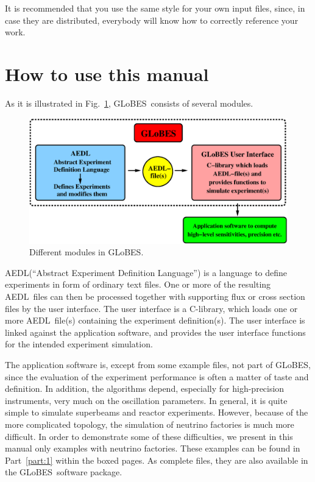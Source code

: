 \documentclass[a4paper,12pt,twoside]{book}
\newcommand{\fig}{Fig.}
\newcommand{\Part}{Part}
\newcommand{\GLOBES}{{\sf GLoBES}}
\newcommand{\AEDL}{{\sf AEDL}}
\newcommand{\figu}[1]{\fig~\ref{fig:#1}}
\begin{document}
It is recommended that you use the same style for your own input files, since, in case they are distributed, everybody will know how to correctly reference your work.

\cleardoublepage
\tableofcontents

\cleardoublepage
\setcounter{page}{1}

\chapter*{How to use this manual}

As it is illustrated in \figu{GLOBES}, \GLOBES\ consists 
of several modules.
%
\begin{figure}[bht]
\begin{center}
\includegraphics[width=16cm]{GLOBES}
\end{center}
\caption{\label{fig:GLOBES} Different modules in \GLOBES .}
\end{figure}
%
\AEDL (``Abstract Experiment Definition Language'') is a language
to define experiments in form of ordinary text files. One or more of 
the resulting \AEDL\ files can then be processed together with supporting 
flux or cross section files by the user interface. The user interface
is a C-library, which loads one or more \AEDL\ file(s)
containing the experiment definition(s). The user interface is linked 
against the application software, and provides the user interface functions
for the intended experiment simulation. 

The application 
software is, except from some example files, not part of \GLOBES , since
the evaluation of the experiment performance is often a matter of taste
and definition. In addition, the algorithms depend, especially for
high-precision instruments, very much on the oscillation parameters.
In general, it is quite simple to simulate superbeams and reactor
experiments. However, because of the more complicated topology, the
simulation of neutrino factories is much more difficult. In order
to demonstrate some of these difficulties, we present in this manual only
examples with neutrino factories. These examples can be found in
\Part~\ref{part:1} within the boxed pages. As complete files, they
are also available in the \GLOBES\ software package.
\end{document}
